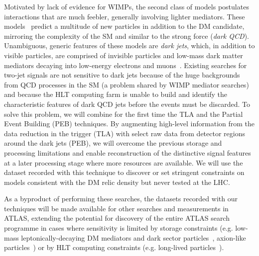 \documentclass[11pt,a4paper]{article}
\begin{document}
Motivated by lack of evidence for WIMPs, the second class of models postulates interactions that are much feebler, generally involving lighter mediators. 
These models~\cite{Strassler:2006im,Cohen:2017pzm} predict a multitude of new particles in addition to the DM candidate, mirroring the complexity of the SM and similar to the strong force (\textit{dark QCD}). 
Unambiguous, generic features of these models are \textit{dark jets}, which, in addition to visible particles, are comprised of invisible particles and low-mass dark matter mediators decaying into low-energy electrons and muons~\cite{Curtin:2014cca}. 
Existing searches for two-jet signals are not sensitive to dark jets %
because of the huge backgrounds from QCD processes in the SM (a problem shared by WIMP mediator searches) and because the HLT computing farm is unable to build and identify the characteristic features of dark QCD jets before the events must be discarded. 
To solve this problem, we will combine for the first time the TLA and the Partial Event Building (PEB) techniques. %
By augmenting high-level information from the data reduction in the trigger (TLA) with select raw data from detector regions around the dark jets (PEB), we will overcome the previous storage and processing limitations and enable reconstruction of the distinctive signal features at a later processing stage where more resources are available. 
We will use the dataset recorded with this technique to discover or set stringent constraints on models consistent with the DM relic density but never tested at the LHC. %

As a byproduct of performing these searches, the datasets recorded with our techniques will be made available for other searches and measurements in ATLAS, extending the potential for discovery of the entire ATLAS search programme in cases where sensitivity is limited by storage constraints (e.g. low-mass leptonically-decaying DM mediators and dark sector particles~\cite{Hoenig:2014dsa}, axion-like particles~\cite{Mariotti:2017vtv}) or by HLT computing constraints (e.g. long-lived particles~\cite{Lee:2018pag}).  
\end{document}
